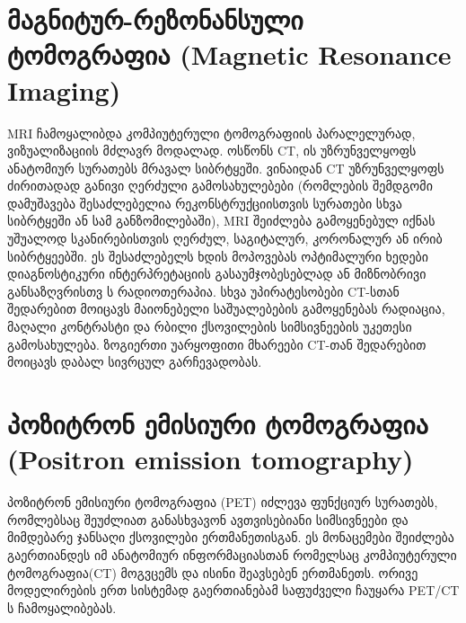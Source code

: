 \documentclass[12pt,a4paper,]{report}
\begin{document}
\section{მაგნიტურ-რეზონანსული ტომოგრაფია (Magnetic Resonance Imaging)}
MRI ჩამოყალიბდა კომპიუტერული ტომოგრაფიის პარალელურად, ვიზუალიზაციის მძლავრ მოდალად. ოსწონს CT, ის უზრუნველყოფს ანატომიურ სურათებს მრავალ სიბრტყეში. ვინაიდან CT უზრუნველყოფს ძირითადად განივი ღერძული გამოსახულებები (რომლების შემდგომი დამუშავება შესაძლებელია რეკონსტრუქციისთვის სურათები სხვა სიბრტყეში ან სამ განზომილებაში), MRI შეიძლება გამოყენებულ იქნას უშუალოდ სკანირებისთვის ღერძულ, საგიტალურ, კორონალურ ან ირიბ სიბრტყეებში. ეს შესაძლებელს ხდის მოპოვებას ოპტიმალური ხედები დიაგნოსტიკური ინტერპრეტაციის გასაუმჯობესებლად ან მიზნობრივი განსაზღვრისთვ ს რადიოთერაპია. სხვა უპირატესობები CT-სთან შედარებით მოიცავს მაიონებელი საშუალებების გამოყენებას რადიაცია, მაღალი კონტრასტი და რბილი ქსოვილების სიმსივნეების უკეთესი გამოსახულება. ზოგიერთი უარყოფითი მხარეები CT-თან შედარებით მოიცავს დაბალ სივრცულ გარჩევადობას.



\section{პოზიტრონ ემისიური ტომოგრაფია (Positron emission tomography)}
პოზიტრონ ემისიური ტომოგრაფია (PET) იძლევა ფუნქციურ სურათებს, რომლებსაც შეუძლიათ განასხვავონ ავთვისებიანი სიმსივნეები და მიმდებარე ჯანსაღი ქსოვილები ერთმანეთისგან. ეს მონაცემები შეიძლება გაერთიანდეს იმ ანატომიურ ინფორმაციასთან რომელსაც კომპიუტერული ტომოგრაფია(CT) მოგვცემს და ისინი შეავსებენ ერთმანეთს. ორივე მოდელირების ერთ სისტემად გაერთიანებამ საფუძველი ჩაუყარა PET/CT ს ჩამოყალიბებას.
\end{document}
